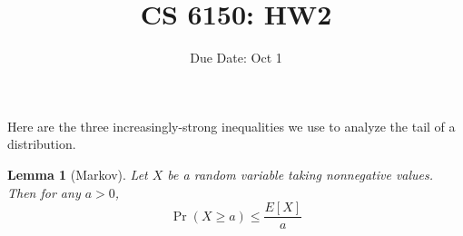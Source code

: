 \documentclass[addpoints]{exam}
\title{CS 6150: HW2}
\date{Due Date: Oct 1}
\newtheorem{lemma}{Lemma}[section]
\begin{document}
\maketitle
\begin{center}
\end{center}

\pointname{}
\bonuspointname{}
\pointformat{[\bfseries\thepoints]}
\printanswers

\begin{center}
  \gradetable
\end{center}
\newpage

Here are the three increasingly-strong inequalities we use to analyze the tail
of a distribution. 

\begin{lemma}[Markov]
  Let $X$ be a random variable taking nonnegative values. Then for any $a > 0$,
\[ \Pr(X \ge a) \le \frac{E[X]}{a} \]
\end{lemma}
\end{document}
